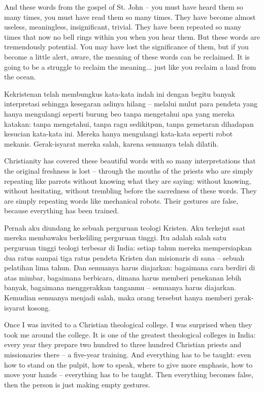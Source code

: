 \english
And these words from the gospel of St. John -- you must have heard them so many times, you must have read them so many times. They have become almost useless, meaningless, insignificant, trivial. They have been repeated so many times that now no bell rings within you when you hear them. But these words are tremendously potential. You may have lost the significance of them, but if you become a little alert, aware, the meaning of these words can be reclaimed. It is going to be a struggle to reclaim the meaning... just like you reclaim a land from the ocean.

\bahasa
Kekristenan telah membungkus kata-kata indah ini dengan begitu banyak interpretasi sehingga kesegaran aslinya hilang -- melalui mulut para pendeta yang hanya mengulangi seperti burung beo tanpa mengetahui apa yang mereka katakan: tanpa mengetahui, tanpa ragu sedikitpun, tanpa gemetaran dihadapan kesucian kata-kata ini. Mereka hanya mengulangi kata-kata seperti robot mekanis. Gerak-isyarat mereka salah, karena semuanya telah dilatih.

\english
Christianity has covered these beautiful words with so many interpretations that the original freshness is lost -- through the mouths of the priests who are simply repeating like parrots without knowing what they are saying: without knowing, without hesitating, without trembling before the sacredness of these words. They are simply repeating words like mechanical robots. Their gestures are false, because everything has been trained.

\bahasa
Pernah aku diundang ke sebuah perguruan teologi Kristen. Aku terkejut saat mereka membawaku berkeliling perguruan tinggi. Itu adalah salah satu perguruan tinggi teologi terbesar di India: setiap tahun mereka mempersiapkan dua ratus sampai tiga ratus pendeta Kristen dan misionaris di sana -- sebuah pelatihan lima tahun. Dan semuanya harus diajarkan: bagaimana cara berdiri di atas mimbar, bagaimana berbicara, dimana harus memberi penekanan lebih banyak, bagaimana menggerakkan tanganmu -- semuanya harus diajarkan. Kemudian semuanya menjadi salah, maka orang tersebut hanya memberi gerak-isyarat kosong.

\english
Once I was invited to a Christian theological college. I was surprised when they took me around the college. It is one of the greatest theological colleges in India: every year they prepare two hundred to three hundred Christian priests and missionaries there -- a five-year training. And everything has to be taught: even how to stand on the pulpit, how to speak, where to give more emphasis, how to move your hands -- everything has to be taught. Then everything becomes false, then the person is just making empty gestures.

